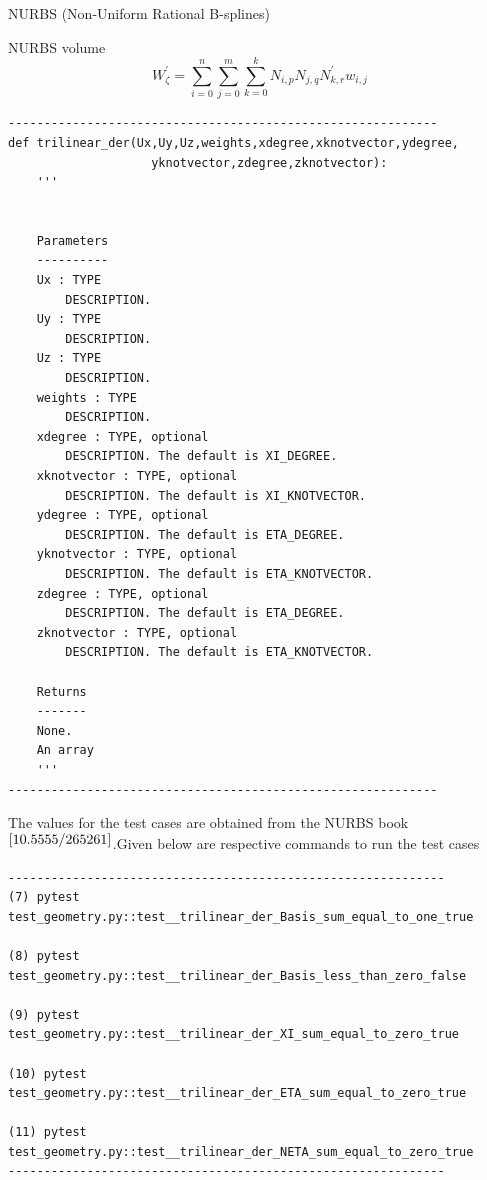 \documentclass[a4paper,12pt,times]{article}
\begin{document}
\begin{section}{NURBS (Non-Uniform Rational B-splines) }
\begin{subsection}{NURBS volume}
\begin{equation}
W_{\zeta}^{\prime}=\sum_{i=0}^{n} \sum_{j=0}^{m} \sum_{k=0}^{k} N_{i, p} N_{j, q} N_{k, r}^{\prime} w_{i, j}
\end{equation}
\end{subsection}
\begin{verbatim}
------------------------------------------------------------
def trilinear_der(Ux,Uy,Uz,weights,xdegree,xknotvector,ydegree,
					yknotvector,zdegree,zknotvector):
    '''
    

    Parameters
    ----------
    Ux : TYPE
        DESCRIPTION.
    Uy : TYPE
        DESCRIPTION.
    Uz : TYPE
        DESCRIPTION.
    weights : TYPE
        DESCRIPTION.
    xdegree : TYPE, optional
        DESCRIPTION. The default is XI_DEGREE.
    xknotvector : TYPE, optional
        DESCRIPTION. The default is XI_KNOTVECTOR.
    ydegree : TYPE, optional
        DESCRIPTION. The default is ETA_DEGREE.
    yknotvector : TYPE, optional
        DESCRIPTION. The default is ETA_KNOTVECTOR.
    zdegree : TYPE, optional
        DESCRIPTION. The default is ETA_DEGREE.
    zknotvector : TYPE, optional
        DESCRIPTION. The default is ETA_KNOTVECTOR.

    Returns
    -------
    None.
	An array
    '''
------------------------------------------------------------
\end{verbatim}
The values for the test cases are obtained from the NURBS book$^{\cite{10.5555/265261}}$.Given below are respective commands to run the test cases
\begin{verbatim}
-------------------------------------------------------------
(7) pytest test_geometry.py::test__trilinear_der_Basis_sum_equal_to_one_true

(8) pytest test_geometry.py::test__trilinear_der_Basis_less_than_zero_false

(9) pytest test_geometry.py::test__trilinear_der_XI_sum_equal_to_zero_true

(10) pytest test_geometry.py::test__trilinear_der_ETA_sum_equal_to_zero_true

(11) pytest test_geometry.py::test__trilinear_der_NETA_sum_equal_to_zero_true
-------------------------------------------------------------
\end{verbatim}
\end{section}
\end{document}
